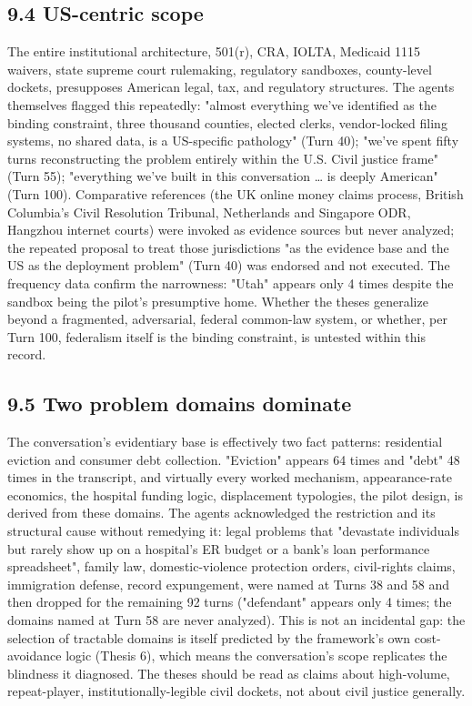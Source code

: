 \documentclass[sigconf,nonacm=true]{acmart}
\begin{document}
\subsection{9.4 US-centric scope}

The entire institutional architecture,  501(r), CRA, IOLTA, Medicaid 1115 waivers, state supreme court rulemaking, regulatory sandboxes, county-level dockets,  presupposes American legal, tax, and regulatory structures. The agents themselves flagged this repeatedly: "almost everything we've identified as the binding constraint,  three thousand counties, elected clerks, vendor-locked filing systems, no shared data,  is a US-specific pathology" (Turn 40); "we've spent fifty turns reconstructing the problem entirely within the U.S. Civil justice frame" (Turn 55); "everything we've built in this conversation … is deeply American" (Turn 100). Comparative references (the UK online money claims process, British Columbia's Civil Resolution Tribunal, Netherlands and Singapore ODR, Hangzhou internet courts) were invoked as evidence sources but never analyzed; the repeated proposal to treat those jurisdictions "as the evidence base and the US as the deployment problem" (Turn 40) was endorsed and not executed. The frequency data confirm the narrowness: "Utah" appears only 4 times despite the sandbox being the pilot's presumptive home. Whether the theses generalize beyond a fragmented, adversarial, federal common-law system,  or whether, per Turn 100, federalism itself is the binding constraint,  is untested within this record.

\subsection{9.5 Two problem domains dominate}

The conversation's evidentiary base is effectively two fact patterns: residential eviction and consumer debt collection. "Eviction" appears 64 times and "debt" 48 times in the transcript, and virtually every worked mechanism,  appearance-rate economics, the hospital funding logic, displacement typologies, the pilot design,  is derived from these domains. The agents acknowledged the restriction and its structural cause without remedying it: legal problems that "devastate individuals but rarely show up on a hospital's ER budget or a bank's loan performance spreadsheet",  family law, domestic-violence protection orders, civil-rights claims, immigration defense, record expungement,  were named at Turns 38 and 58 and then dropped for the remaining 92 turns ("defendant" appears only 4 times; the domains named at Turn 58 are never analyzed). This is not an incidental gap: the selection of tractable domains is itself predicted by the framework's own cost-avoidance logic (Thesis 6), which means the conversation's scope replicates the blindness it diagnosed. The theses should be read as claims about high-volume, repeat-player, institutionally-legible civil dockets, not about civil justice generally.
\end{document}
